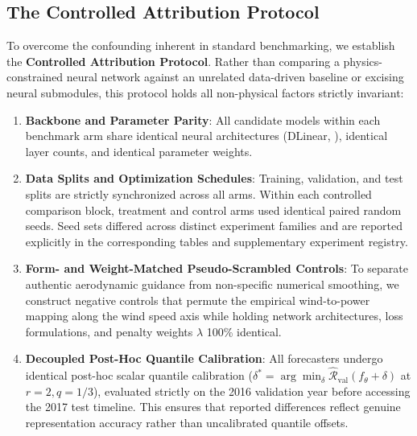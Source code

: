 \subsection{The Controlled Attribution Protocol}
To overcome the confounding inherent in standard benchmarking, we establish the \textbf{Controlled Attribution Protocol}. Rather than comparing a physics-constrained neural network against an unrelated data-driven baseline or excising neural submodules, this protocol holds all non-physical factors strictly invariant:
\begin{enumerate}[leftmargin=*]
\item \textbf{Backbone and Parameter Parity}: All candidate models within each benchmark arm share identical neural architectures (DLinear, \cite{zeng2023dlinear}), identical layer counts, and identical parameter weights.
\item \textbf{Data Splits and Optimization Schedules}: Training, validation, and test splits are strictly synchronized across all arms. Within each controlled comparison block, treatment and control arms used identical paired random seeds. Seed sets differed across distinct experiment families and are reported explicitly in the corresponding tables and supplementary experiment registry.
\item \textbf{Form- and Weight-Matched Pseudo-Scrambled Controls}: To separate authentic aerodynamic guidance from non-specific numerical smoothing, we construct negative controls that permute the empirical wind-to-power mapping along the wind speed axis while holding network architectures, loss formulations, and penalty weights $\lambda$ 100\% identical.
\item \textbf{Decoupled Post-Hoc Quantile Calibration}: All forecasters undergo identical post-hoc scalar quantile calibration ($\delta^* = \arg\min_\delta \hat{\mathcal{R}}_{\text{val}}(f_\theta + \delta)$ at $r=2, q=1/3$), evaluated strictly on the 2016 validation year before accessing the 2017 test timeline. This ensures that reported differences reflect genuine representation accuracy rather than uncalibrated quantile offsets.
\end{enumerate}

